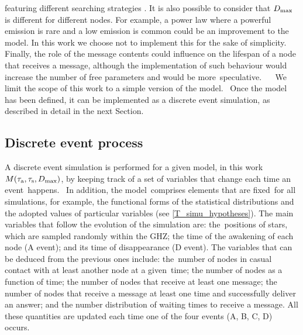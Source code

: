 \documentclass[crop]{CSLB}
\newcommand{\ceti}{node}
\newcommand{\cetis}{nodes}
\begin{document}
featuring different searching strategies
\citep{hippke_interstellar_2017}. 
%
It is also possible to consider that $D_{\rm max}$ is different for
different \cetis{}.
%
For example, a power law where a powerful emission is rare and a low
emission is common could be an improvement to the model.
%
In this work we choose not to implement this for the sake of
simplicity.
%
Finally, the role of the message contents could influence on the
lifespan of a \ceti{} that receives a message, although the
implementation of such behaviour would increase the number of free
parameters and would be more speculative.   
%
We limit the scope of this work to a simple version of the model. 
%
Once the model has been defined, it can be implemented as a discrete
event simulation, as described in detail in the next Section.



\subsection{Discrete event process}

A discrete event simulation is performed for a given model, in this
work $M(\tau_{\rm a}, \tau_{\rm s}, D_{\rm max})$, by keeping track of
a set of variables that change each time an event happens. 
%
In addition, the model comprises elements that are fixed for all
simulations, for example, the functional forms of the statistical
distributions and the adopted values of particular variables (see
\ref{T_simu_hypotheses}).
%
The main variables that follow the evolution of the simulation are:
the positions of stars, which are sampled randomly within the GHZ; the
time of the awakening of each node (A event); and its time of
disappearance (D event).
%
The variables that can be deduced from the previous ones include:
the number of \cetis{} in casual contact with at least another \ceti{}
at a given time; the number of \cetis{} as a function of time; the
number of \cetis{} that receive at least one message; the number of
\cetis{} that receive a message at least one time and successfully
deliver an answer; and the number distribution of waiting times to
receive a message.
%
All these quantities are updated each time one of the four events (A,
B, C, D) occurs.   
\end{document}
